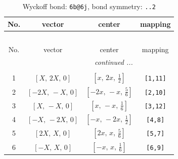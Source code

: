 \documentclass[fleqn,8pt]{jsarticle}
\begin{document}
\begin{longtable}{cccc}
\caption{Wyckoff bond: {\tt 6b@6j}, bond symmetry: {\tt ..2}}
 \\
 \hline \hline
No. & vector & center & mapping \\ \hline \endfirsthead

\multicolumn{3}{l}{\tablename\ \thetable{}} \\
 \hline \hline
No. & vector & center & mapping \\ \hline \endhead

 \hline \hline
\multicolumn{3}{r}{\footnotesize\it continued ...} \\ \endfoot

 \hline \hline
\multicolumn{3}{r}{} \\ \endlastfoot

1 & $\left[ X,\, 2 X,\, 0 \right]$ & $\left[ x,\, 2 x,\, \frac{1}{2} \right]$ & {\tt [1,11]} \\ \hline
2 & $\left[ - 2 X,\, - X,\, 0 \right]$ & $\left[ - 2 x,\, - x,\, \frac{5}{6} \right]$ & {\tt [2,10]} \\ \hline
3 & $\left[ X,\, - X,\, 0 \right]$ & $\left[ x,\, - x,\, \frac{1}{6} \right]$ & {\tt [3,12]} \\ \hline
4 & $\left[ - X,\, - 2 X,\, 0 \right]$ & $\left[ - x,\, - 2 x,\, \frac{1}{2} \right]$ & {\tt [4,8]} \\ \hline
5 & $\left[ 2 X,\, X,\, 0 \right]$ & $\left[ 2 x,\, x,\, \frac{5}{6} \right]$ & {\tt [5,7]} \\ \hline
6 & $\left[ - X,\, X,\, 0 \right]$ & $\left[ - x,\, x,\, \frac{1}{6} \right]$ & {\tt [6,9]} \\
\end{longtable}
\renewcommand{\arraystretch}{1.2}
\end{document}
